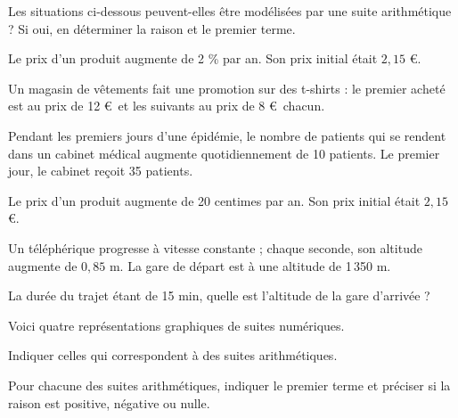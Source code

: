 \documentclass[12pt,a4paper]{book}
\begin{document}
\exerciceDS{}

Les situations ci-dessous peuvent-elles être modélisées par une suite arithmétique ? Si oui, en déterminer la raison et le premier terme.
\begin{enumMet}
	\item Le prix d'un produit augmente de 2 \% par an. Son prix initial était $2,15$ \euro.
	\item Un magasin de vêtements fait une promotion sur des t-shirts : le premier acheté est au prix de 12 \euro\ et les suivants au prix de 8 \euro\ chacun.
	\item Pendant les premiers jours d'une épidémie, le nombre de patients qui se rendent dans un cabinet médical augmente quotidiennement de 10 patients. Le premier jour, le cabinet reçoit 35 patients.
	\item Le prix d'un produit augmente de 20 centimes par an. Son prix initial était $2,15$ \euro.
\end{enumMet}

\exerciceDS{}

Un téléphérique progresse à vitesse constante ; chaque seconde, son altitude augmente de $0,85$ m. La gare de départ est à une altitude de 1\,350 m.
\begin{itemMet}
	\item La durée du trajet étant de 15 min, quelle est l'altitude de la gare d'arrivée ?
\end{itemMet}

\exerciceDS{}

Voici quatre représentations graphiques de suites numériques.
\begin{enumMet}
	\item Indiquer celles qui correspondent à des suites arithmétiques.
	\item Pour chacune des suites arithmétiques, indiquer le premier terme et préciser si la raison est positive, négative ou nulle.
\end{enumMet}
\end{document}
